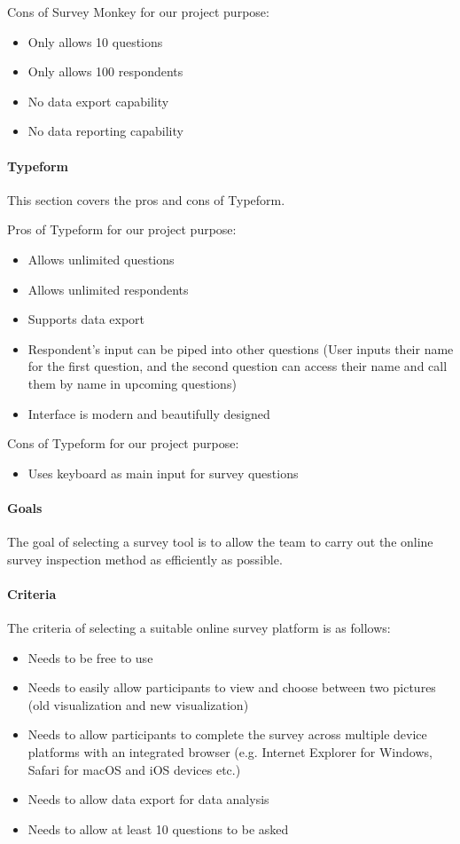Cons of Survey Monkey for our project purpose:
\begin{itemize}
\item Only allows 10 questions
\item Only allows 100 respondents
\item No data export capability
\item No data reporting capability
\end{itemize}

\paragraph{Typeform}
This section covers the pros and cons of Typeform.

Pros of Typeform for our project purpose:
\begin{itemize}
\item Allows unlimited questions
\item Allows unlimited respondents
\item Supports data export
\item Respondent's input can be piped into other questions (User inputs their name for the first question, and the second question can access their name and call them by name in upcoming questions)
\item Interface is modern and beautifully designed
\end{itemize}

Cons of Typeform for our project purpose:
\begin{itemize}
\item Uses keyboard as main input for survey questions
\end{itemize}

\paragraph{Goals}
The goal of selecting a survey tool is to allow the team to carry out the online survey inspection method as efficiently as possible.

\paragraph{Criteria}
The criteria of selecting a suitable online survey platform is as follows:
\begin{itemize}
\item Needs to be free to use
\item Needs to easily allow participants to view and choose between two pictures (old visualization and new visualization)
\item Needs to allow participants to complete the survey across multiple device platforms with an integrated browser (e.g. Internet Explorer for Windows, Safari for macOS and iOS devices etc.)
\item Needs to allow data export for data analysis
\item Needs to allow at least 10 questions to be asked
\end{itemize}

